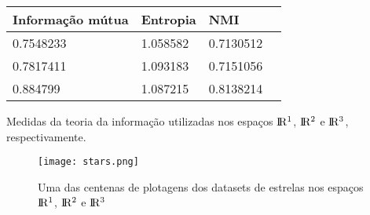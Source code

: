\documentclass{article}
\begin{document}
        \begin{center}
            \begin{tabular}{llll}
                Informação mútua & Entropia & NMI \\
                \hline
                0.7548233 & 1.058582 & 0.7130512 \\
                0.7817411 & 1.093183 & 0.7151056 \\
                0.884799 & 1.087215 & 0.8138214
            \end{tabular}\par
            Medidas da teoria da informação utilizadas nos espaços $\rm I\!R^{1}$, $\rm I\!R^{2}$ e $\rm I\!R^{3}$, respectivamente.
        \end{center}

        \begin{figure}
            \begin{center}
                \texttt{[image: stars.png]}
            \end{center}
            \caption{Uma das centenas de plotagens dos datasets de estrelas nos espaços $\rm I\!R^{1}$, $\rm I\!R^{2}$ e $\rm I\!R^{3}$}
        \end{figure}
\end{document}
